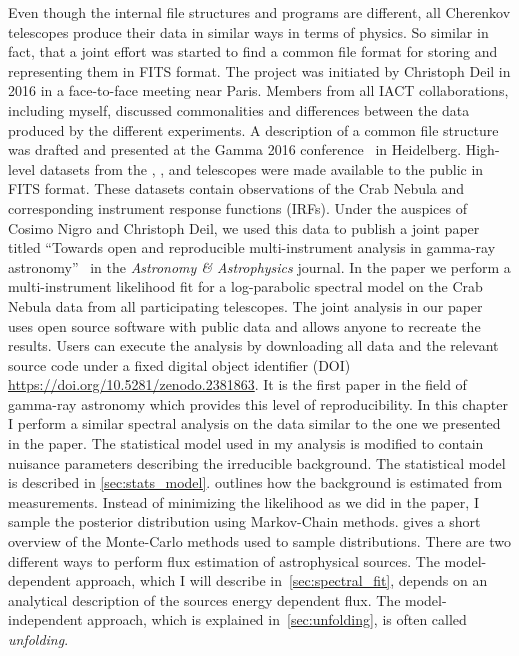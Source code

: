 Even though the internal file structures and programs are different,
all Cherenkov telescopes produce their data in similar ways in terms of physics.
So similar in fact, that a joint effort was started to find a common file format for storing and representing them in FITS format.
The project was initiated by Christoph Deil in 2016 in a face-to-face meeting near Paris.
Members from all IACT collaborations, including myself, discussed commonalities and differences between the data produced by the 
different experiments. A description of a common file structure was drafted and presented at the Gamma 2016 conference~\cite{open_gamma_proceeding} in Heidelberg. 
High-level datasets from the \magic, \hess, \veritas and \fact telescopes were made available to the public in FITS format. These datasets contain 
observations of the Crab Nebula and corresponding instrument response functions (IRFs).
Under the auspices of Cosimo Nigro and Christoph Deil,
we used this data to publish a joint paper titled \enquote{Towards open and reproducible multi-instrument analysis in gamma-ray astronomy}~\cite{joint_crab}
in the \emph{Astronomy \& Astrophysics} journal.
In the paper we perform a multi-instrument likelihood fit for a log-parabolic spectral model on the Crab Nebula data from all participating telescopes.
The joint analysis in our paper uses open source software with public data and allows anyone to recreate the results. 
Users can execute the analysis by downloading all data and the relevant source code under a fixed digital object identifier (DOI) 
\url{https://doi.org/10.5281/zenodo.2381863}.
It is the first paper in the field of gamma-ray astronomy which provides this level of reproducibility.
In this chapter I perform a similar spectral analysis on the data similar to the one we presented in the paper. The statistical model used in my analysis is 
modified to contain nuisance parameters describing the irreducible background.
The statistical model is described in \cref{sec:stats_model}. 
 outlines how the background is estimated from measurements.
Instead of minimizing the likelihood as we did in the paper, I sample the posterior distribution using Markov-Chain methods.
 gives a short overview of the Monte-Carlo methods used to sample distributions.
There are two different ways to perform flux estimation of astrophysical sources. The model-dependent  
approach, which I will describe in~\cref{sec:spectral_fit}, depends on an analytical description of the sources energy dependent flux. 
The model-independent approach, which is explained in~\ref{sec:unfolding}, is often called \emph{unfolding}.

